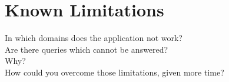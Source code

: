 \section{Known Limitations}
In which domains does the application not work? \\
Are there queries which cannot be answered? \\
Why? \\
How could you overcome those limitations, given more time?
